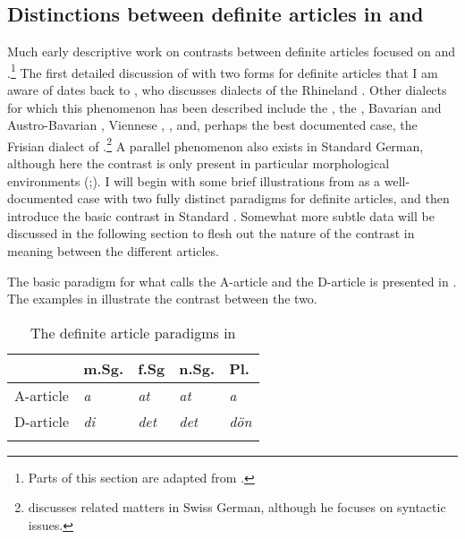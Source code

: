 \documentclass[output=paper
,modfonts
,nonflat]{langscibook}
\begin{document}
\subsection{Distinctions between definite
  articles in  and }

Much early descriptive work on contrasts between definite articles focused on  and .\footnote{Parts of this section are adapted from \citet{Schwarz2013}.} The first
detailed discussion of  with two forms for definite articles that I am aware of dates back to\linebreak
\citet{Heinrichs1954}, who discusses dialects of the Rhineland
\citep[see also][]{Hartmann1967}. Other dialects for which this
phenomenon has been described include 
the 
\citep{Hartmann1982}, 
the  \citep{Himmelmann1997},
Bavarian \citep{Scheutz1988,Schwager2007} 
and Austro-Bavarian \citep{BruggerPrinzhorn1996,Wiltschko2013},
Viennese \citep{SchusterSchikola1984},
 \citep{Schmitt2006},
and, perhaps the best
documented case, the Frisian dialect of 
\citep{Ebert1971,Ebert1971b}.\footnote{\citet{Leu2008} discusses
  related matters in Swiss German, although he focuses
  on syntactic issues.}  A parallel phenomenon also exists in
Standard German, although here the contrast is only present in
particular morphological environments
(\citealt{Hartmann1978,Hartmann1980,Haberland1985,Cieschinger2006,Waldmuller2008};\linebreak \citealt{Schwarz2009}). I
will begin with some brief illustrations from  as a
well-documented case with two fully distinct paradigms for definite
articles, and then introduce the basic contrast in Standard
. Somewhat more subtle  data will be discussed in the
following section to flesh out the nature of the contrast in meaning
between the different articles.

The basic paradigm for what \citet{Ebert1971b} calls the A-article and
the D-article is presented in . The
examples in  illustrate the contrast between the two.

\begin{table}[h]
	\begin{tabular}{lllll} 
		\lsptoprule
		& {m.Sg.} & {f.Sg} & {n.Sg.} & {Pl}.\\
		\midrule
		{A-article} & \textit{a} & \textit{at} & \textit{at} & \textit{a}\\
		{D-article} & \textit{di} & \textit{det} & \textit{det} & \textit{d\"on}\\
		\lspbottomrule
	\end{tabular}
	\caption{The definite article paradigms in  \citep[159]{Ebert1971b}\label{tab:schwarz:1}}
\end{table}
\end{document}
